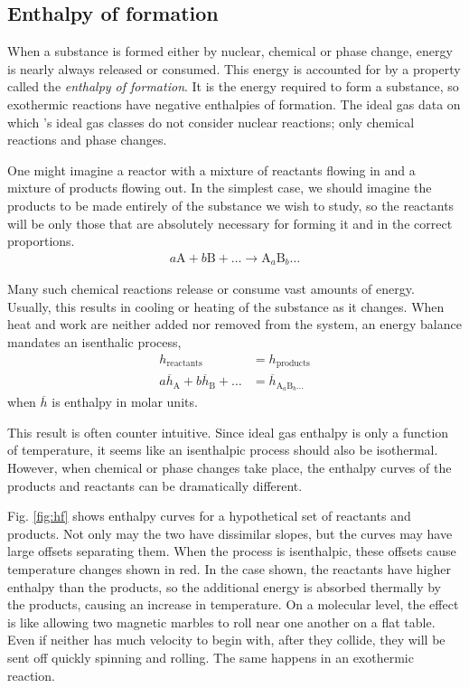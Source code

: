 \subsection{Enthalpy of formation}\label{sec:ig:hf}

When a substance is formed either by nuclear, chemical or phase change, energy is nearly always released or consumed.  This energy is accounted for by a property called the \emph{enthalpy of formation}.  It is the energy required to form a substance, so exothermic reactions have negative enthalpies of formation.  The ideal gas data on which \PM's ideal gas classes do not consider nuclear reactions; only chemical reactions and phase changes.  

One might imagine a reactor with a mixture of reactants flowing in and a mixture of products flowing out.  In the simplest case, we should imagine the products to be made entirely of the substance we wish to study, so the reactants will be only those that are absolutely necessary for forming it and in the correct proportions.
\begin{align}
a \mathrm{A}+ b \mathrm{B} + \ldots \rightarrow \mathrm{A}_a \mathrm{B}_b \ldots
\end{align}

Many such chemical reactions release or consume vast amounts of energy.  Usually, this results in cooling or heating of the substance as it changes.  When heat and work are neither added nor removed from the system, an energy balance mandates an isenthalic process,
\begin{align}
h_\mathrm{reactants} &= h_\mathrm{products}\nonumber\\
a \overline{h}_\mathrm{A} + b \overline{h}_\mathrm{B} + \ldots &= \overline{h}_{\mathrm{A}_a \mathrm{B}_b \ldots}
\end{align}
when $\overline{h}$ is enthalpy in molar units.

This result is often counter intuitive.  Since ideal gas enthalpy is only a function of temperature, it seems like an isenthalpic process should also be isothermal.  However, when chemical or phase changes take place, the enthalpy curves of the products and reactants can be dramatically different.  

Fig. \ref{fig:hf} shows enthalpy curves for a hypothetical set of reactants and products.  Not only may the two have dissimilar slopes, but the curves may have large offsets separating them.  When the process is isenthalpic, these offsets cause temperature changes shown in red.  In the case shown, the reactants have higher enthalpy than the products, so the additional energy is absorbed thermally by the products, causing an increase in temperature.  On a molecular level, the effect is like allowing two magnetic marbles to roll near one another on a flat table.  Even if neither has much velocity to begin with, after they collide, they will be sent off quickly spinning and rolling.  The same happens in an exothermic reaction.

